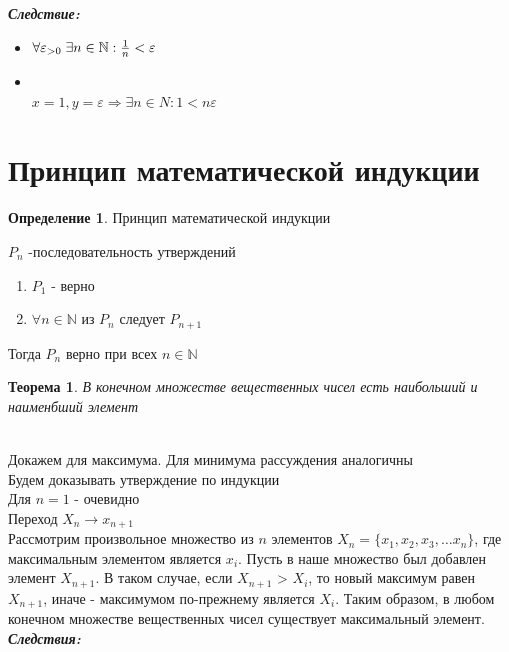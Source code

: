 \documentclass[12pt,letterpaper]{report}
\makeatletter
\newtheorem*{theorem-non}{Теорема}
\theoremstyle{definition}
\newtheorem*{conj}{Определение}
\renewenvironment{proof}[1][\proofname]{%
   \par\pushQED{\qed}\normalfont%
   \topsep6\p@\@plus6\p@\relax
   \trivlist\item[\hskip\labelsep\bfseries#1\@addpunct{.}]%
   \ignorespaces
}{%
   \popQED\endtrivlist\@endpefalse
}
\makeatother
\begin{document}
\textbf{\textit{Следствие:}}
    \begin{itemize}
        \item[] $\forall \varepsilon_{> 0} \; \exists n \in \mathbb{N}: {{1}\over{n}} < \varepsilon$
        \begin{proof}
           \quad \\ $x = 1, y = \varepsilon \Longrightarrow \exists n \in N: 1 < n\varepsilon$
        \end{proof} 
    \end{itemize}
\section{Принцип математической индукции}
\begin{conj}
    Принцип математической индукции
\end{conj}
$P_n$ -последовательность утверждений 
\begin{enumerate}
    \item $P_1$ - верно
    \item $\forall n \in \mathbb{N}$ из $P_n$ следует $P_{n+1}$
\end{enumerate}
Тогда $P_n$ верно при всех $n \in \mathbb{N}$
\begin{theorem-non}
    В конечном множестве вещественных чисел есть наибольший и наименбший элемент
\end{theorem-non}
\begin{proof}
    \quad \\
    Докажем для максимума. Для минимума рассуждения аналогичны \\
    Будем доказывать утверждение по индукции \\
    Для $n = 1$ - очевидно \\
    Переход $X_n \longrightarrow x_{n+1}$ \\
    Рассмотрим произвольное множество из $n$ элементов $X_n = \{x_1, x_2, x_3, \dots x_n\}$, где максимальным элементом 
    является $x_i$. Пусть в наше множество был добавлен элемент $X_{n+1}$. В таком случае, если $X_{n+1}$ > $X_{i}$, то новый максимум равен
    $X_{n+1}$, иначе - максимумом по-прежнему является $X_{i}$. Таким образом, в любом конечном множестве вещественных чисел существует максимальный
    элемент.     
\end{proof}
\newpage
\textbf{\textit{Следствия:}}
\end{document}
